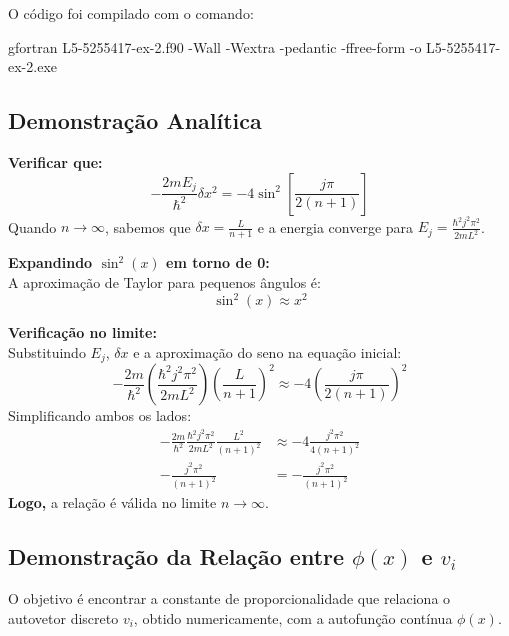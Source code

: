 \documentclass[12pt, a4paper]{article} %
\begin{document}
        O c\'odigo foi compilado com o comando:

    gfortran L5-5255417-ex-2.f90 -Wall -Wextra -pedantic -ffree-form -o L5-5255417-ex-2.exe

            \subsection{Demonstra\c{c}\~ao Anal\'itica}

                \textbf{Verificar que:}
                $$-\frac{2mE_j}{\hbar^2}\delta x^2 = -4\sin^2\left[\frac{j\pi}{2(n+1)}\right]$$
                Quando $n \rightarrow \infty$, sabemos que $\delta x = \frac{L}{n+1}$ e a energia converge para $E_j = \frac{\hbar^2j^2\pi^2}{2mL^2}$.

                \vspace{1em}
                \noindent
                \textbf{Expandindo $\sin^2(x)$ em torno de 0:}
                \\
                A aproximação de Taylor para pequenos ângulos é:
                $$\sin^2(x) \approx x^2$$

                \vspace{1em}
                \noindent
                \textbf{Verificação no limite:}
                \\
                Substituindo $E_j$, $\delta x$ e a aproximação do seno na equação inicial:
                $$-\frac{2m}{\hbar^2}\left(\frac{\hbar^2j^2\pi^2}{2mL^2}\right)\left(\frac{L}{n+1}\right)^2 \approx -4\left(\frac{j\pi}{2(n+1)}\right)^2$$
                Simplificando ambos os lados:
                \begin{align*}
                -\frac{2m}{\hbar^2}\frac{\hbar^2j^2\pi^2}{2mL^2}\frac{L^2}{(n+1)^2} &\approx -4\frac{j^2\pi^2}{4(n+1)^2} \\
                -\frac{j^2\pi^2}{(n+1)^2} &= -\frac{j^2\pi^2}{(n+1)^2}
                \end{align*}
                \textbf{Logo,} a relação é válida no limite $n \rightarrow \infty$.

            \subsection{Demonstração da Relação entre $\phi(x)$ e $v_i$}

                O objetivo é encontrar a constante de proporcionalidade que relaciona o autovetor discreto $v_i$, obtido numericamente, com a autofunção contínua $\phi(x)$.
\end{document}
